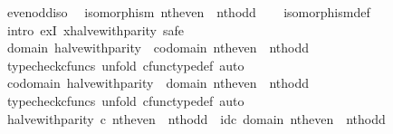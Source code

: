 \begin{isabellebody}
\endisatagproof
{\isafoldproof}%
%
\isadelimproof
\isanewline
%
\endisadelimproof
\isanewline
{}\isamarkupfalse%
\ even{\isacharunderscore}{\kern0pt}odd{\isacharunderscore}{\kern0pt}iso{\isacharcolon}{\kern0pt}\isanewline
\ \ {\isachardoublequoteopen}isomorphism\ {\isacharparenleft}{\kern0pt}nth{\isacharunderscore}{\kern0pt}even\ {\isasymamalg}\ nth{\isacharunderscore}{\kern0pt}odd{\isacharparenright}{\kern0pt}{\isachardoublequoteclose}\isanewline
%
\isadelimproof
\ \ %
\endisadelimproof
%
\isatagproof
{}\isamarkupfalse%
\ isomorphism{\isacharunderscore}{\kern0pt}def\isanewline
{}\isamarkupfalse%
\ {\isacharparenleft}{\kern0pt}intro\ exI{\isacharbrackleft}{\kern0pt}\ x{\isacharequal}{\kern0pt}halve{\isacharunderscore}{\kern0pt}with{\isacharunderscore}{\kern0pt}parity{\isacharbrackright}{\kern0pt}{\isacharcomma}{\kern0pt}\ safe{\isacharparenright}{\kern0pt}\isanewline
\ \ \isamarkupfalse%
\ {\isachardoublequoteopen}domain\ halve{\isacharunderscore}{\kern0pt}with{\isacharunderscore}{\kern0pt}parity\ {\isacharequal}{\kern0pt}\ codomain\ {\isacharparenleft}{\kern0pt}nth{\isacharunderscore}{\kern0pt}even\ {\isasymamalg}\ nth{\isacharunderscore}{\kern0pt}odd{\isacharparenright}{\kern0pt}{\isachardoublequoteclose}\isanewline
\ \ \ \ \isamarkupfalse%
\ {\isacharparenleft}{\kern0pt}typecheck{\isacharunderscore}{\kern0pt}cfuncs{\isacharcomma}{\kern0pt}\ unfold\ cfunc{\isacharunderscore}{\kern0pt}type{\isacharunderscore}{\kern0pt}def{\isacharcomma}{\kern0pt}\ auto{\isacharparenright}{\kern0pt}\isanewline
\ \ \isamarkupfalse%
\ {\isachardoublequoteopen}codomain\ halve{\isacharunderscore}{\kern0pt}with{\isacharunderscore}{\kern0pt}parity\ {\isacharequal}{\kern0pt}\ domain\ {\isacharparenleft}{\kern0pt}nth{\isacharunderscore}{\kern0pt}even\ {\isasymamalg}\ nth{\isacharunderscore}{\kern0pt}odd{\isacharparenright}{\kern0pt}{\isachardoublequoteclose}\isanewline
\ \ \ \ \isamarkupfalse%
\ {\isacharparenleft}{\kern0pt}typecheck{\isacharunderscore}{\kern0pt}cfuncs{\isacharcomma}{\kern0pt}\ unfold\ cfunc{\isacharunderscore}{\kern0pt}type{\isacharunderscore}{\kern0pt}def{\isacharcomma}{\kern0pt}\ auto{\isacharparenright}{\kern0pt}\isanewline
\ \ \isamarkupfalse%
\ {\isachardoublequoteopen}halve{\isacharunderscore}{\kern0pt}with{\isacharunderscore}{\kern0pt}parity\ {\isasymcirc}\isactrlsub c\ nth{\isacharunderscore}{\kern0pt}even\ {\isasymamalg}\ nth{\isacharunderscore}{\kern0pt}odd\ {\isacharequal}{\kern0pt}\ id\isactrlsub c\ {\isacharparenleft}{\kern0pt}domain\ {\isacharparenleft}{\kern0pt}nth{\isacharunderscore}{\kern0pt}even\ {\isasymamalg}\ nth{\isacharunderscore}{\kern0pt}odd{\isacharparenright}{\kern0pt}{\isacharparenright}{\kern0pt}{\isachardoublequoteclose}\isanewline

\end{isabellebody}
